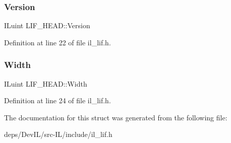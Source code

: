 \subsubsection{\texorpdfstring{Version}{Version}}
{\footnotesize\ttfamily I\+Luint L\+I\+F\+\_\+\+H\+E\+A\+D\+::\+Version}



Definition at line 22 of file il\+\_\+lif.\+h.

\mbox{\label{structLIF__HEAD_ac1e4c5eeb864fcfbc6c34f451a7607b1}} 
\subsubsection{\texorpdfstring{Width}{Width}}
{\footnotesize\ttfamily I\+Luint L\+I\+F\+\_\+\+H\+E\+A\+D\+::\+Width}



Definition at line 24 of file il\+\_\+lif.\+h.



The documentation for this struct was generated from the following file\+:\begin{DoxyCompactItemize}
\item 
deps/\+Dev\+I\+L/src-\/\+I\+L/include/il\+\_\+lif.\+h\end{DoxyCompactItemize}
